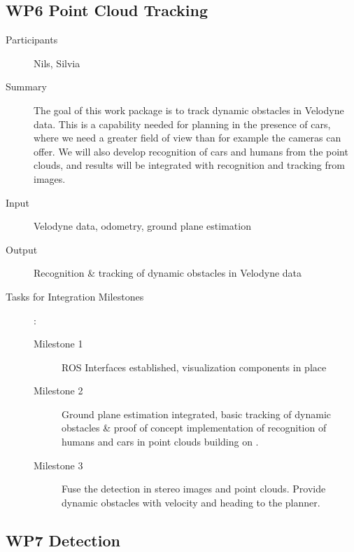 \documentclass[11pt,a4paper]{article}
\begin{document}
\subsection{WP6 Point Cloud Tracking}

\begin{description}
\item[Participants] Nils, Silvia
\item[Summary] The goal of this work package is to track dynamic obstacles in Velodyne data.
			   This is a capability needed for planning in the presence of cars, where we
			   need a greater field of view than for example the cameras can offer.
			   We will also develop recognition of cars and humans from the point clouds,
			   and results will be integrated with recognition and tracking from images.
\item[Input] Velodyne data, odometry, ground plane estimation
\item[Output] Recognition \& tracking of dynamic obstacles in Velodyne data
\item[Tasks for Integration Milestones]:\
	\begin{description}
		\item[Milestone 1] ROS Interfaces established, visualization components in place
		\item[Milestone 2] Ground plane estimation integrated, basic tracking of dynamic obstacles \&
						   proof of concept implementation of recognition of humans and cars in point 
						   clouds building on \cite{wang2015voting}.
		\item[Milestone 3] Fuse the detection in stereo images and point clouds. Provide dynamic obstacles
						   with velocity and heading to the planner.
	\end{description}	 
\end{description}

\subsection{WP7 Detection} %
\end{document}
